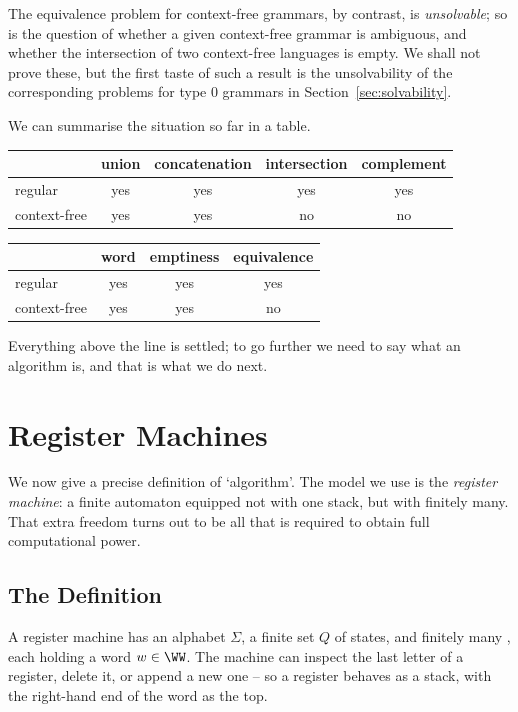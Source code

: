 \begin{remark}
	The equivalence problem for context-free grammars, by contrast, is \emph{unsolvable}; so is the question of whether a given context-free grammar is ambiguous, and whether the intersection of two context-free languages is empty. We shall not prove these, but the first taste of such a result is the unsolvability of the corresponding problems for type $0$ grammars in Section~\ref{sec:solvability}.
\end{remark}

We can summarise the situation so far in a table.
\begin{center}
	\begin{tabular}{l|cccc}
		& union & concatenation & intersection & complement \\\hline
		regular & yes & yes & yes & yes \\
		context-free & yes & yes & no & no
	\end{tabular}
	\qquad
	\begin{tabular}{l|ccc}
		& word & emptiness & equivalence \\\hline
		regular & yes & yes & yes \\
		context-free & yes & yes & no
	\end{tabular}
\end{center}
Everything above the line is settled; to go further we need to say what an algorithm is, and that is what we do next.

\section{Register Machines}\label{sec:rm}

We now give a precise definition of `algorithm'. The model we use is the \emph{register machine}: a finite automaton equipped not with one stack, but with finitely many. That extra freedom turns out to be all that is required to obtain full computational power.

\subsection{The Definition}

A register machine has an alphabet $\Sigma$, a finite set $Q$ of states, and finitely many , each holding a word $w \in \WW$. The machine can inspect the last letter of a register, delete it, or append a new one -- so a register behaves as a stack, with the right-hand end of the word as the top.

